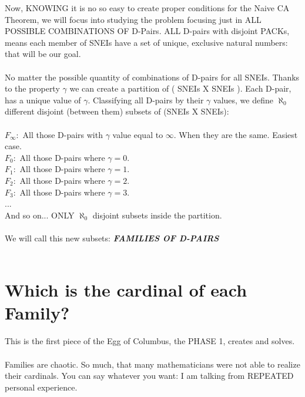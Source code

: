 	\noindent
	Now, KNOWING it is no so easy to create proper conditions for the Naive CA Theorem, we will focus into studying the problem focusing just in ALL POSSIBLE COMBINATIONS OF D-Pairs. ALL D-pairs with disjoint PACKs, means each member of SNEIs have a set of unique, exclusive natural numbers: that will be our goal.
	\\\\
	
	\noindent
	No matter the possible quantity of combinations of D-pairs for all SNEIs. Thanks to the property $\gamma$ we can create a partition of ( SNEIs  X SNEIs ). Each D-pair, has a unique value of $\gamma$. Classifying all D-pairs by their $\gamma$ values, we define $\aleph_{0}$ different disjoint (between them) subsets of (SNEIs X SNEIs):\\\\
	$F_{\infty}:$ All those D-pairs with $\gamma$ value equal to $\infty$. When they are the same. Easiest case.\\
	$F_{0}:$ All those D-pairs where $\gamma = 0$. \\
	$F_{1}:$ All those D-pairs where $\gamma = 1$. \\ 
	$F_{2}:$ All those D-pairs where $\gamma = 2$. \\
	$F_{3}:$ All those D-pairs where $\gamma = 3$. \\
	... \\
	And so on... ONLY $\aleph_{0}$ disjoint subsets inside the partition.
	\\\\
	
	\noindent
	We will call this new subsets: \textbf{\textit{FAMILIES OF D-PAIRS}}
	\\\\
	
	
	\section{Which is the cardinal of each Family?}
	
		\noindent
		This is the first piece of the Egg of Columbus, the PHASE 1, creates and solves.
		\\\\
		
		\noindent
		Families are chaotic. So much, that many mathematicians were not able to realize their cardinals. You can say whatever you want: I am talking from REPEATED personal experience.
		\\\\
		

